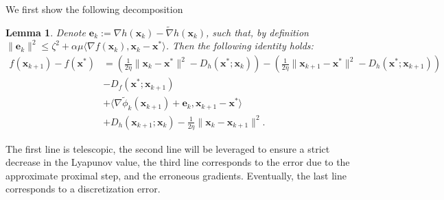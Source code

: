 \documentclass{article}
\def\ve{{\bm{e}}}
\def\vx{{\bm{x}}}
\theoremstyle{plain}
\newtheorem{lemma}[theorem]{Lemma}
\theoremstyle{definition}
\theoremstyle{remark}
\begin{document}
We first show the following decomposition

\begin{lemma}
\label{app:lemma:proof_proxyprox_1}
Denote $\ve_k := \nabla h(\vx_k) - \tilde \nabla h(\vx_k)$, such that, by definition $\|\ve_k\|^2 \le \zeta^2 + \alpha \mu \langle \nabla f(\vx_k),\vx_k - \vx^*\rangle$. Then the following identity holds:
    \begin{align*}
        f(\vx_{k+1}) - f(\vx^*) &=  \left(\frac{1}{2\eta}\|\vx_{k}- \vx^*\|^2 - D_{h}(\vx^*;\vx_{k})\right) - \left(\frac{1}{2\eta}\|\vx_{k+1}- \vx^*\|^2 - D_{h}(\vx^*;\vx_{k+1}) \right) \\
        &- D_f(\vx^*;\vx_{k+1})\\
        & + \langle \nabla \tilde \phi_k(\vx_{k+1}) + \ve_k, \vx_{k+1} - \vx^* \rangle \\
        &+ D_h(\vx_{k+1};\vx_k) - \frac{1}{2\eta}\|\vx_{k}- \vx_{k+1}\|^2.
    \end{align*}
\end{lemma}
The first line is telescopic, the second line will be leveraged to ensure a strict decrease in the Lyapunov value, the third line corresponds to the error due to the approximate proximal step, and the erroneous gradients. Eventually, the last line corresponds to a discretization error.
\end{document}
